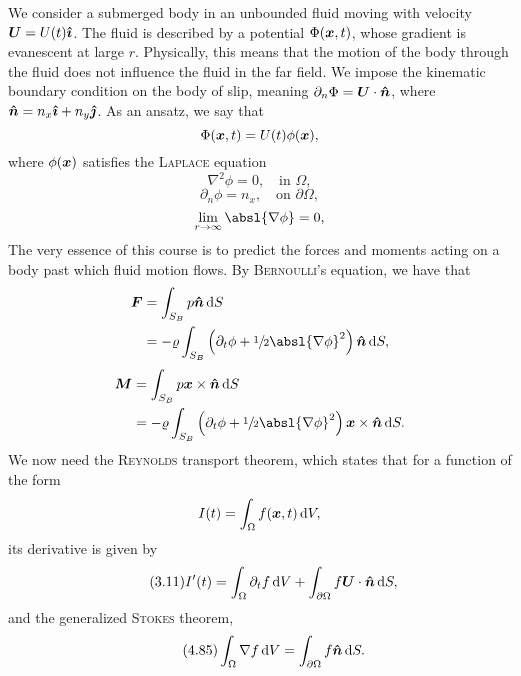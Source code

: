 \begin{figure}[H]
    \centering
    
\end{figure}
We consider a submerged body in an unbounded fluid moving with velocity $\bm{U} = U(t)\bm{\hat{\imath}}$.
The fluid is described by a potential $\Phi(\bm{x}, t)$, whose gradient is evanescent at large $r$.
Physically, this means that the motion of the body through the fluid does not influence the fluid in the far field.
We impose the kinematic boundary condition on the body of slip, meaning $\partial_n \Phi = \bm{U}\cdot\bm{\hat{n}}$, where $\bm{\hat{n}} = n_x \bm{\hat{\imath}} + n_y \bm{\hat{\jmath}}$.
As an ansatz, we say that
\[
    \Phi(\bm{x}, t) = U(t) \phi(\bm{x}),
\]
where $\phi(\bm{x})$ satisfies the \textsc{Laplace} equation
\[
    \nabla^2 \phi = 0, \quad \text{in } \Omega,
\]
\[
    \partial_n \phi = n_x, \quad \text{on } \partial\Omega,
\]
\[
    \lim_{r \to \infty} \absl{\nabla\phi} = 0,
\]
The very essence of this course is to predict the forces and moments acting on a body past which fluid motion flows.
By \textsc{Bernoulli}'s equation, we have that
\begin{equation*}
    \begin{aligned}
        \bm{F} & = \int_{S_B} p \nhat\,\dee S\\
        & = -\varrho\int_{S_B} \left(\deet\phi + \sfrac{1}{2}{\absl{\nabla\phi}}^2\right)\nhat \,\dee S,
    \end{aligned}
\end{equation*}
\begin{equation*}
    \begin{aligned}
        \bm{M} & = \int_{S_B} p \xvec\times\nhat \,\dee S\\
        & = -\varrho \int_{S_B} \left( \deet\phi + \sfrac{1}{2}{\absl{\nabla\phi}}^2 \right) \xvec\times\nhat \,\dee S.
    \end{aligned}
\end{equation*}
We now need the \textsc{Reynolds} transport theorem, which states that for a function of the form
\[
    I(t) = \int_{\Omega} f(\bm{x}, t) \,\mathrm{d} V,
\]
its derivative is given by
\begin{equation}\tag{3.11}\label{eq:REYNOLDS_transport}
    I^{\prime}(t) = \int_{\Omega} \partial_t f \,\mathrm{d} V + \int_{\partial\Omega} f \bm{U}\cdot\bm{\hat{n}} \,\mathrm{d} S,
\end{equation}
and the generalized \textsc{Stokes} theorem,
\begin{equation}\tag{4.85}\label{eq:generalized_STOKES}
    \int_{\Omega} \nabla f \,\mathrm{d} V = \int_{\partial\Omega} f \bm{\hat{n}} \,\mathrm{d} S.
\end{equation}
